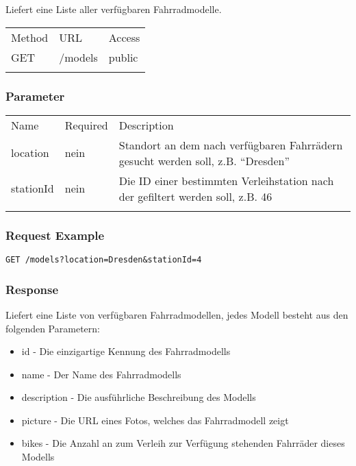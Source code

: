 Liefert eine Liste aller verfügbaren Fahrradmodelle.

\begin{longtable}[c]{@{}lll@{}}
\toprule\addlinespace
Method & URL & Access
\\\addlinespace
\midrule\endhead
GET & /models & public
\\\addlinespace
\bottomrule
\end{longtable}

\subsubsection{Parameter}\label{parameter}

\begin{longtable}[c]{@{}lll@{}}
\toprule\addlinespace
Name & Required & Description
\\\addlinespace
\midrule\endhead
location & nein & Standort an dem nach verfügbaren Fahrrädern gesucht werden soll, z.B. ``Dresden''
\\\addlinespace
stationId & nein & Die ID einer bestimmten Verleihstation nach der gefiltert werden soll, z.B. 46
\\\addlinespace
\bottomrule
\end{longtable}

\subsubsection{Request Example}\label{request-example}

\begin{verbatim}
GET /models?location=Dresden&stationId=4
\end{verbatim}

\subsubsection{Response}\label{response}

Liefert eine Liste von verfügbaren Fahrradmodellen, jedes Modell besteht
aus den folgenden Parametern: 
\begin{itemize}
\item id - Die einzigartige Kennung des Fahrradmodells
\item name - Der Name des Fahrradmodells
\item description - Die ausführliche Beschreibung des Modells
\item picture - Die URL eines Fotos, welches das Fahrradmodell zeigt
\item  bikes - Die Anzahl an zum Verleih zur Verfügung stehenden Fahrräder dieses Modells
\end{itemize}

